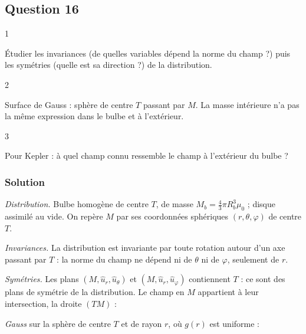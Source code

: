 \documentclass[11pt,a4paper]{article}
\newcommand{\equationajustee}[1]{%
  \sbox{\boiteequation}{$\displaystyle #1$}%
  \ifdim\wd\boiteequation>\linewidth
    \[\resizebox{\linewidth}{!}{\usebox{\boiteequation}}\]%
  \else
    \[#1\]%
  \fi}
\begin{document}
\hypertarget{question-16}{%
\subsection{Question 16}\label{question-16}}

\begin{indication}{1}

Étudier les invariances (de quelles variables dépend la norme du champ ?) puis les symétries (quelle est sa direction ?) de la distribution.

\end{indication}

\begin{indication}{2}

Surface de Gauss : sphère de centre \(T\) passant par \(M\). La masse intérieure n'a pas la même expression dans le bulbe et à l'extérieur.

\end{indication}

\begin{indication}{3}

Pour Kepler : à quel champ connu ressemble le champ à l'extérieur du bulbe ?

\end{indication}

\hypertarget{solution-15}{%
\subsubsection{Solution}\label{solution-15}}

\emph{Distribution.} Bulbe homogène de centre \(T\), de masse \(M_b=\frac43\pi R_b^3\mu_0\) ; disque assimilé au vide. On repère \(M\) par ses coordonnées sphériques \((r,\theta,\varphi)\) de centre \(T\).

\emph{Invariances.} La distribution est invariante par toute rotation autour d'un axe passant par \(T\) : la norme du champ ne dépend ni de \(\theta\) ni de \(\varphi\), seulement de \(r\).

\emph{Symétries.} Les plans \((M,\hat u_r,\hat u_\theta)\) et \((M,\hat u_r,\hat u_\varphi)\) contiennent \(T\) : ce sont des plans de symétrie de la distribution. Le champ en \(M\) appartient à leur intersection, la droite \((TM)\) :

\equationajustee{\vec g(M)=g(r)\,\hat u_r}

\emph{Gauss} sur la sphère de centre \(T\) et de rayon \(r\), où \(g(r)\) est uniforme :
\end{document}
